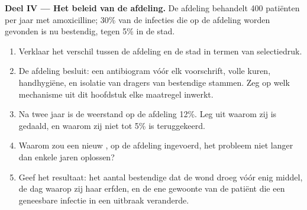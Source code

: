 \begin{problem}
\medskip
\noindent\textbf{Deel IV --- Het beleid van de afdeling.}
De afdeling behandelt 400 patiënten per jaar met amoxicilline; 30\% van
de infecties die op de afdeling worden gevonden is nu bestendig, tegen
5\% in de stad.
\begin{enumerate}[resume]
  \item Verklaar het verschil tussen de afdeling en de stad in termen van
        selectiedruk.
  \item De afdeling besluit: een antibiogram vóór elk voorschrift, volle
        kuren, handhygiëne, en isolatie van dragers van bestendige
        stammen. Zeg op welk mechanisme uit dit hoofdstuk elke maatregel
        inwerkt.
  \item Na twee jaar is de weerstand op de afdeling 12\%. Leg uit waarom
        zij is gedaald, en waarom zij niet tot 5\% is teruggekeerd.
  \item Waarom zou een nieuw , op de afdeling ingevoerd, het
        probleem niet langer dan enkele jaren oplossen?
  \item Geef het resultaat: het aantal bestendige  dat de wond
        droeg vóór enig middel, de dag waarop zij haar erfden, en de ene
        gewoonte van de patiënt die een geneesbare infectie in een
        uitbraak veranderde.
\end{enumerate}
\end{problem}
